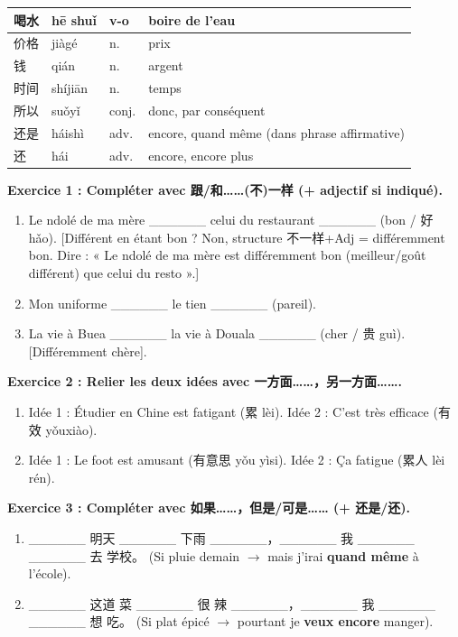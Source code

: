 \documentclass[11pt]{article}
\newcommand{\cle}[1]{{\popxbold\color{popdark}#1}}
\begin{document}
\begin{center}
\begin{tabularx}{\linewidth}{|X|X|X|X|}
\hline
喝水 & hē shuǐ & v-o & boire de l'eau \\
\hline
价格 & jiàgé & n. & prix \\
\hline
钱 & qián & n. & argent \\
\hline
时间 & shíjiān & n. & temps \\
\hline
所以 & suǒyǐ & conj. & donc, par conséquent \\
\hline
还是 & háishì & adv. & encore, quand même (dans phrase affirmative) \\
\hline
还 & hái & adv. & encore, encore plus \\
\hline
\end{tabularx}
\end{center}

\begin{exercice}
\textbf{Exercice 1 : Compléter avec \cle{跟/和……(不)一样} (+ adjectif si indiqué).}
\begin{enumerate}
    \item Le ndolé de ma mère \_\_\_\_\_\_ celui du restaurant \_\_\_\_\_\_ (bon / 好 hǎo). [Différent en étant bon ? Non, structure \cle{不一样+Adj} = différemment bon. Dire : « Le ndolé de ma mère est différemment bon (meilleur/goût différent) que celui du resto ».]
    \item Mon uniforme \_\_\_\_\_\_ le tien \_\_\_\_\_\_ (pareil).
    \item La vie à Buea \_\_\_\_\_\_ la vie à Douala \_\_\_\_\_\_ (cher / 贵 guì). [Différemment chère].
\end{enumerate}

\textbf{Exercice 2 : Relier les deux idées avec \cle{一方面……，另一方面……}.}
\begin{enumerate}
    \item Idée 1 : Étudier en Chine est fatigant (\cle{累 lèi}). Idée 2 : C'est très efficace (\cle{有效 yǒuxiào}).
    \item Idée 1 : Le foot est amusant (\cle{有意思 yǒu yìsi}). Idée 2 : Ça fatigue (\cle{累人 lèi rén}).
\end{enumerate}

\textbf{Exercice 3 : Compléter avec \cle{如果……，但是/可是……} (+ \cle{还是}/\cle{还}).}
\begin{enumerate}
    \item \_\_\_\_\_\_ 明天 \_\_\_\_\_\_ 下雨 \_\_\_\_\_\_，\_\_\_\_\_\_ 我 \_\_\_\_\_\_ \_\_\_\_\_\_ 去 学校。 (Si pluie demain $\rightarrow$ mais j'irai \textbf{quand même} à l'école).
    \item \_\_\_\_\_\_ 这道 菜 \_\_\_\_\_\_ 很 辣 \_\_\_\_\_\_，\_\_\_\_\_\_ 我 \_\_\_\_\_\_ \_\_\_\_\_\_ 想 吃。 (Si plat épicé $\rightarrow$ pourtant je \textbf{veux encore} manger).
\end{enumerate}


\end{exercice}
\end{document}
